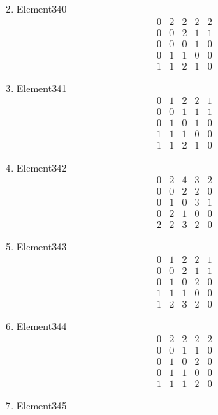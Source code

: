 \documentclass[12pt]{article}
\begin{document}
\begin{multicols}{3}
\begin{enumerate}
\begin{equation*}
\end{equation*}
\item Element340
\begin{equation*}
\begin{array}{ccccc}
0&2&2&2&2\\
0&0&2&1&1\\
0&0&0&1&0\\
0&1&1&0&0\\
1&1&2&1&0
\end{array}
\end{equation*}
\item Element341
\begin{equation*}
\begin{array}{ccccc}
0&1&2&2&1\\
0&0&1&1&1\\
0&1&0&1&0\\
1&1&1&0&0\\
1&1&2&1&0
\end{array}
\end{equation*}
\item Element342
\begin{equation*}
\begin{array}{ccccc}
0&2&4&3&2\\
0&0&2&2&0\\
0&1&0&3&1\\
0&2&1&0&0\\
2&2&3&2&0
\end{array}
\end{equation*}
\item Element343
\begin{equation*}
\begin{array}{ccccc}
0&1&2&2&1\\
0&0&2&1&1\\
0&1&0&2&0\\
1&1&1&0&0\\
1&2&3&2&0
\end{array}
\end{equation*}
\item Element344
\begin{equation*}
\begin{array}{ccccc}
0&2&2&2&2\\
0&0&1&1&0\\
0&1&0&2&0\\
0&1&1&0&0\\
1&1&1&2&0
\end{array}
\end{equation*}
\item Element345

\end{enumerate}
\end{multicols}
\end{document}
